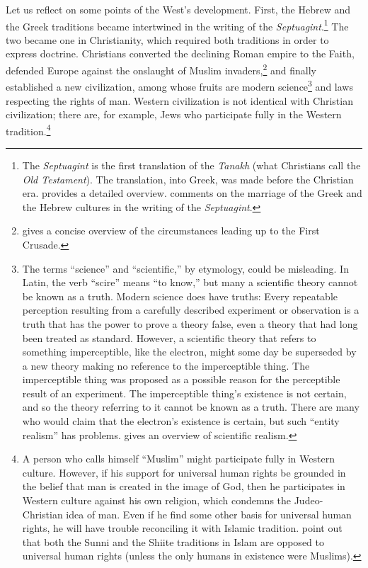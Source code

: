\documentclass[twocolumn]{article}
\begin{document}
Let us reflect on some points of the West's development.  First, the Hebrew and
the Greek traditions became intertwined in the writing of the {\it
Septuagint}.\footnote{%
   The {\it Septuagint} is the first translation of the {\it Tanakh} (what
   Christians call the {\it Old Testament}).  The translation, into Greek, was
   made before the Christian era.  \cite{vdh1912} provides a detailed overview.
   \cite{r2005, r2007} comments on the marriage of the Greek and the Hebrew
   cultures in the writing of the {\it Septuagint}.
}
The two became one in Christianity, which required both traditions in order to
express doctrine.  Christians converted the declining Roman empire to the
Faith, defended Europe against the onslaught of Muslim invaders,\footnote{%
   \citet[Chapter 4]{b1938} gives a concise overview of the circumstances
   leading up to the First Crusade.
}
and finally established a new civilization, among whose fruits are modern
science\footnote{%
   The terms ``science'' and ``scientific,'' by etymology, could be misleading.
   In Latin, the verb ``scire'' means ``to know,'' but many a scientific theory
   cannot be known as a truth.  Modern science does have truths: Every
   repeatable perception resulting from a carefully described experiment or
   observation is a truth that has the power to prove a theory false, even a
   theory that had long been treated as standard.  However, a scientific theory
   that refers to something imperceptible, like the electron, might some day be
   superseded by a new theory making no reference to the imperceptible thing.
   The imperceptible thing was proposed as a possible reason for the
   perceptible result of an experiment.  The imperceptible thing's existence is
   not certain, and so the theory referring to it cannot be known as a truth.
   There are many who would claim that the electron's existence is certain, but
   such ``entity realism'' has problems.  \cite{c2016} gives an overview of
   scientific realism.%
}
and laws respecting the rights of man.  Western civilization is not identical
with Christian civilization; there are, for example, Jews who participate fully
in the Western tradition.\footnote{%
   A person who calls himself ``Muslim'' might participate fully in Western
   culture.  However, if his support for universal human rights be grounded in
   the belief that man is created in the image of God, then he participates in
   Western culture against his own religion, which condemns the Judeo-Christian
   idea of man.  Even if he find some other basis for universal human rights,
   he will have trouble reconciling it with Islamic tradition.  \cite{as2003}
   point out that both the Sunni and the Shiite traditions in Islam are opposed
   to universal human rights (unless the only humans in existence were
   Muslims).
}
\end{document}
